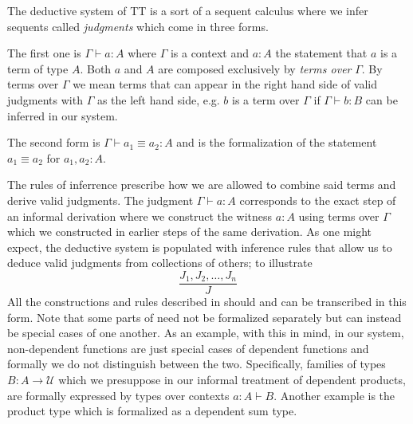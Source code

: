 \documentclass[12pt]{report}
\theoremstyle{definition}
\begin{document}
The deductive system of TT is a sort of a sequent calculus where we infer sequents called \textit{judgments} which come in three forms.

The first one is $\Gamma \vdash a : A$ where $\Gamma$ is a context and $a : A$ the statement that $a$ is a term of type $A$. 
Both $a$ and $A$ are composed exclusively by \textit{terms over} $\Gamma$. 
By terms over $\Gamma$ we mean terms that can appear in the right hand side of valid judgments with $\Gamma$ as the left hand side, e.g. $b$ is a term over $\Gamma$ if $\Gamma \vdash b : B$ can be inferred in our system. 

The second form is $\Gamma \vdash a_1 \equiv a_2 : A$ and is the formalization of the statement $a_1 \equiv a_2$ for $a_1, a_2 : A$. 

The rules of inferrence prescribe how we are allowed to combine said terms and derive valid judgments. 
The judgment $\Gamma \vdash a  : A$ corresponds to the exact step of an informal derivation where we construct the witness $a : A$ using terms over $\Gamma$ which we constructed in earlier steps of the same derivation. 
As one might expect, the deductive system is populated with inference rules that allow us to deduce valid judgments from collections of others; to illustrate
$$\frac{J_1,J_2,\ldots,J_n}{J}$$
All the constructions and rules described in  should and can be transcribed in this form. 
Note that some parts of  need not be formalized separately but can instead be special cases of one another. 
As an example, with this in mind, in our system, non-dependent functions are just special cases of dependent functions and formally we do not distinguish between the two. 
Specifically, families of types $B : A\rightarrow \mathcal{U}$ which we presuppose in our informal treatment of dependent products, are formally expressed by types over contexts $a : A \vdash B$. 
Another example is the product type which is formalized as a dependent sum type. 
\end{document}
